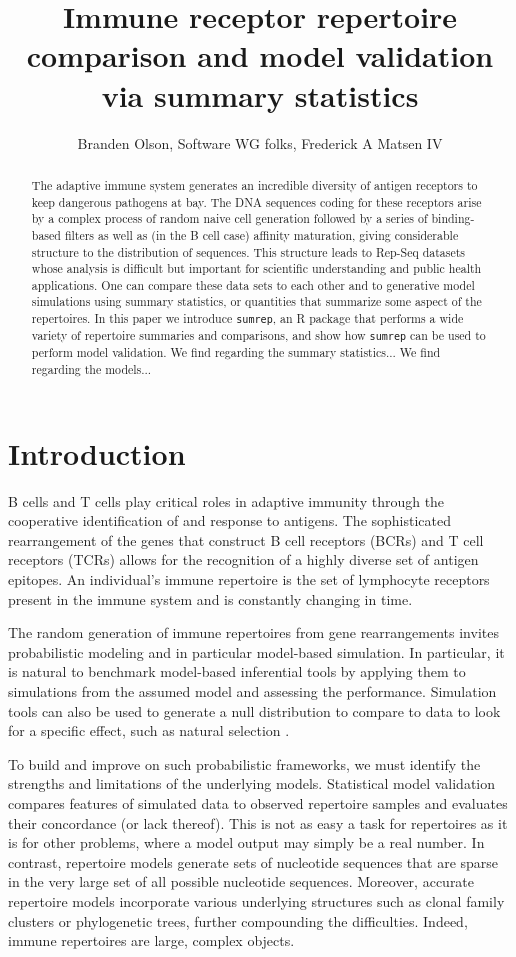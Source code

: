 \documentclass{article}
\title{Immune receptor repertoire comparison and model validation via summary statistics}
\author{Branden Olson, Software WG folks, Frederick A Matsen IV}
\begin{document}
\maketitle

\begin{abstract}
The adaptive immune system generates an incredible diversity of antigen receptors to keep dangerous pathogens at bay.
The DNA sequences coding for these receptors arise by a complex process of random naive cell generation followed by a series of binding-based filters as well as (in the B cell case) affinity maturation, giving considerable structure to the distribution of sequences.
This structure leads to Rep-Seq datasets whose analysis is difficult but important for scientific understanding and public health applications.
One can compare these data sets to each other and to generative model simulations using summary statistics, or quantities that summarize some aspect of the repertoires.
In this paper we introduce \texttt{sumrep}, an R package that performs a wide variety of repertoire summaries and comparisons, and show how \texttt{sumrep} can be used to perform model validation.
We find regarding the summary statistics...
We find regarding the models...
\end{abstract}

\section*{Introduction}

B cells and T cells play critical roles in adaptive immunity through the cooperative identification of and response to antigens.
The sophisticated rearrangement of the genes that construct B cell receptors (BCRs) and T cell receptors (TCRs) allows for the recognition of a highly diverse set of antigen epitopes.
An individual's immune repertoire is the set of lymphocyte receptors present in the immune system and is constantly changing in time.

The random generation of immune repertoires from gene rearrangements invites probabilistic modeling and in particular model-based simulation.
In particular, it is natural to benchmark model-based inferential tools by applying them to simulations from the assumed model and assessing the performance.
Simulation tools can also be used to generate a null distribution to compare to data to look for a specific effect, such as natural selection \cite{Yaari2012-kk}.

To build and improve on such probabilistic frameworks, we must identify the strengths and limitations of the underlying models.
Statistical model validation compares features of simulated data to observed repertoire samples and evaluates their concordance (or lack thereof).
This is not as easy a task for repertoires as it is for other problems, where a model output may simply be a real number.
In contrast, repertoire models generate sets of nucleotide sequences that are sparse in the very large set of all possible nucleotide sequences.
Moreover, accurate repertoire models incorporate various underlying structures such as clonal family clusters or phylogenetic trees, further compounding the difficulties.
Indeed, immune repertoires are large, complex objects.
\end{document}
